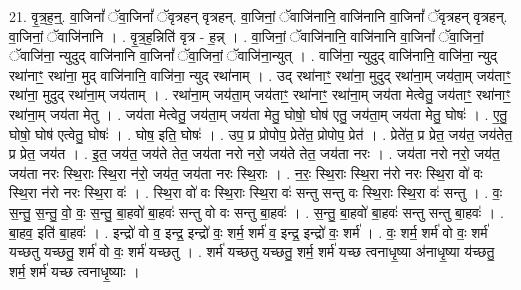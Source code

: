 \documentclass[17pt]{extarticle}
\begin{document}
21. वृ॒त्र॒ह॒न्॒. वा॒जिनां᳚ ॅवा॒जिनां᳚ ॅवृत्रहन् वृत्रहन्. वा॒जिनां॒ ॅवाजि॑नानि॒ वाजि॑नानि वा॒जिनां᳚ ॅवृत्रहन् वृत्रहन्. वा॒जिनां॒ ॅवाजि॑नानि । . वृ॒त्र॒ह॒न्निति॑ वृत्र - ह॒न्न् । . वा॒जिनां॒ ॅवाजि॑नानि॒ वाजि॑नानि वा॒जिनां᳚ ॅवा॒जिनां॒ ॅवाजि॑ना॒ न्युदुद् वाजि॑नानि वा॒जिनां᳚ ॅवा॒जिनां॒ ॅवाजि॑ना॒न्युत् । . वाजि॑ना॒ न्युदुद् वाजि॑नानि॒ वाजि॑ना॒ न्युद् रथा॑नाꣳ॒॒ रथा॑ना॒ मुद् वाजि॑नानि॒ वाजि॑ना॒ न्युद् रथा॑नाम् । . उद् रथा॑नाꣳ॒॒ रथा॑ना॒ मुदुद् रथा॑ना॒म् जय॑ता॒म् जय॑ताꣳ॒॒ रथा॑ना॒ मुदुद् रथा॑ना॒म् जय॑ताम् । . रथा॑ना॒म् जय॑ता॒म् जय॑ताꣳ॒॒ रथा॑नाꣳ॒॒ रथा॑ना॒म् जय॑ता मेत्वेतु॒ जय॑ताꣳ॒॒ रथा॑नाꣳ॒॒ रथा॑ना॒म् जय॑ता मेतु । . जय॑ता मेत्वेतु॒ जय॑ता॒म् जय॑ता मेतु॒ घोषो॒ घोष॑ एतु॒ जय॑ता॒म् जय॑ता मेतु॒ घोषः॑ । . ए॒तु॒ घोषो॒ घोष॑ एत्वेतु॒ घोषः॑ । . घोष॒ इति॒ घोषः॑ । . उप॒ प्र प्रोपोप॒ प्रेते॑त॒ प्रोपोप॒ प्रेत॑ । . प्रेते॑त॒ प्र प्रेत॒ जय॑त॒ जय॑तेत॒ प्र प्रेत॒ जय॑त । . इ॒त॒ जय॑त॒ जय॑ते तेत॒ जय॑ता नरो नरो॒ जय॑ते तेत॒ जय॑ता नरः । . जय॑ता नरो नरो॒ जय॑त॒ जय॑ता नरः स्थि॒राः स्थि॒रा न॑रो॒ जय॑त॒ जय॑ता नरः स्थि॒राः । . न॒रः॒ स्थि॒राः स्थि॒रा न॑रो नरः स्थि॒रा वो॑ वः स्थि॒रा न॑रो नरः स्थि॒रा वः॑ । . स्थि॒रा वो॑ वः स्थि॒राः स्थि॒रा वः॑ सन्तु सन्तु वः स्थि॒राः स्थि॒रा वः॑ सन्तु । . वः॒ स॒न्तु॒ स॒न्तु॒ वो॒ वः॒ स॒न्तु॒ बा॒हवो॑ बा॒हवः॑ सन्तु वो वः सन्तु बा॒हवः॑ । . स॒न्तु॒ बा॒हवो॑ बा॒हवः॑ सन्तु सन्तु बा॒हवः॑ । . बा॒हव॒ इति॑ बा॒हवः॑ । . इन्द्रो॑ वो व॒ इन्द्र॒ इन्द्रो॑ वः॒ शर्म॒ शर्म॑ व॒ इन्द्र॒ इन्द्रो॑ वः॒ शर्म॑ । . वः॒ शर्म॒ शर्म॑ वो वः॒ शर्म॑ यच्छतु यच्छतु॒ शर्म॑ वो वः॒ शर्म॑ यच्छतु । . शर्म॑ यच्छतु यच्छतु॒ शर्म॒ शर्म॑ यच्छ त्वनाधृ॒ष्या अ॑नाधृ॒ष्या य॑च्छतु॒ शर्म॒ शर्म॑ यच्छ
त्वनाधृ॒ष्याः । \newline
\end{document}
